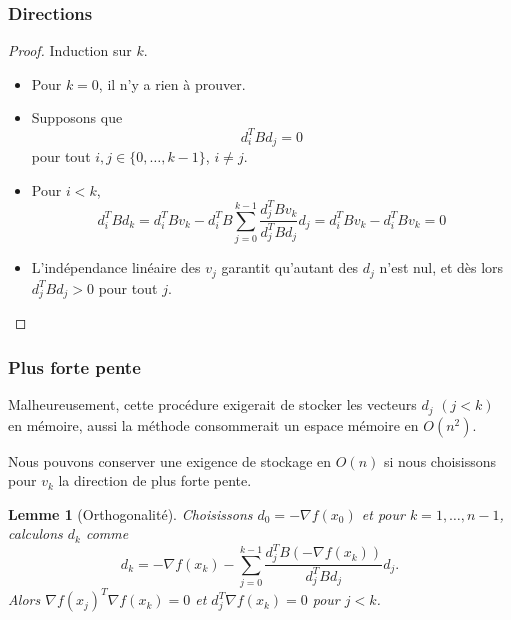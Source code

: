 \documentclass[usepdftitle=false]{beamer}
\newtheorem{lem}{Lemme}
\begin{document}
\begin{frame}
\frametitle{Directions}

\begin{proof}
Induction sur $k$.
\begin{itemize}
\item
Pour $k = 0$, il n'y a rien à prouver.
\item
Supposons que
$$
d_i^T B d_j = 0
$$
pour tout $i, j \in \lbrace 0,\ldots, k - 1 \rbrace$, $i \ne j$.
\item
Pour $i < k$,
$$
d_i^T B d_k
= d_i^T B v_k - d_i^T B \sum_{j = 0}^{k-1} \frac{d_j^TBv_k}{d_j^TBd_j}d_j
= d_i^T B v_k - d_i^T B v_k
= 0
$$
\item
L'indépendance linéaire des $v_j$ garantit qu'autant des $d_j$ n'est nul, et dès lors $d_j^TBd_j > 0$ pour tout $j$.
\end{itemize}

\end{proof}

\end{frame}

\begin{frame}
\frametitle{Plus forte pente}

Malheureusement, cette procédure exigerait de stocker les vecteurs $d_j$ $(j < k)$ en mémoire, aussi la méthode consommerait un espace mémoire en $O(n^2)$.

\mbox{}

Nous pouvons conserver une exigence de stockage en $O(n)$ si nous choisissons pour $v_k$ la direction de plus forte pente.

\begin{lem}[Orthogonalité]
Choisissons $d_0 = -\nabla f(x_0)$ et pour $k = 1,\ldots, n-1$, calculons $d_k$ comme
$$
d_k = -\nabla f(x_k) - \sum_{j = 0}^{k-1} \frac{d_j^TB(-\nabla f(x_k))}{d_j^TBd_j} d_j.
$$
Alors $\nabla f(x_j)^T \nabla f(x_k) = 0$ et $d_j^T \nabla f(x_k) = 0$ pour $j < k$.
\end{lem}

\end{frame}
\end{document}
